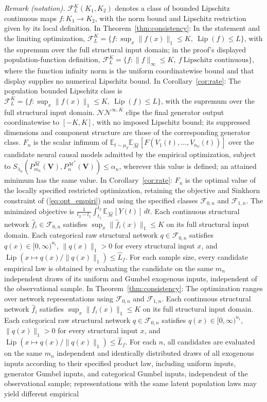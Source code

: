 \documentclass[12pt]{article}
\theoremstyle{plain}
\theoremstyle{definition}
\theoremstyle{remark}
\begin{document}
\noindent\textit{Remark (notation).} $\mathcal{F}_L^K(K_1,K_2)$ denotes a class of bounded Lipschitz continuous maps $f:K_1\rightarrow K_2$, with the norm bound and Lipschitz restriction given by its local definition. In Theorem~\ref{thm:consistency}: In the statement and the limiting optimization, $\mathcal F_L^K=\{f:\sup_x\|f(x)\|_1\leqslant K,\ \operatorname{Lip}(f)\leqslant L\}$, with the supremum over the full structural input domain; in the proof's displayed population-function definition, $\mathcal F_L^K=\{f:\|f\|_\infty\leqslant K,\ f\ \text{Lipschitz continuous}\}$, where the function infinity norm is the uniform coordinatewise bound and that display supplies no numerical Lipschitz bound. In Corollary~\ref{cor:rate}: The population bounded Lipschitz class is $\mathcal F_L^K=\{f:\sup_x\|f(x)\|_1\leqslant K,\ \operatorname{Lip}(f)\leqslant L\}$, with the supremum over the full structural input domain. $\mathcal{NN}^{\infty,K}$ clips the final generator output coordinatewise to $[-K,K]$, with no imposed Lipschitz bound; its suppressed dimensions and component structure are those of the corresponding generator class. $F_n$ is the scalar infimum of $\mathbb{E}_{t\sim\mu_T}\mathbb{E}_{\hat{\mathcal{M}}}[F(V_1(t),\ldots,V_{n_V}(t))]$ over the candidate neural causal models admitted by the empirical optimization, subject to $S_{\lambda_n}(P_{m_n}^{\hat{\mathcal{M}}}(\boldsymbol{V}),P_n^{\mathcal{M}^*}(\boldsymbol{V}))\leqslant\alpha_n$, wherever this value is defined; an attained minimum has the same value. In Corollary~\ref{cor:rate}: $F_n$ is the optimal value of the locally specified restricted optimization, retaining the objective and Sinkhorn constraint of (\ref{eq:opt_empiri}) and using the specified classes $\mathcal F_{0,n}$ and $\mathcal F_{1,n}$. The minimized objective is $\frac{1}{t_2-t_1}\int_{t_1}^{t_2}\mathbb E_{\hat{\mathcal M}}[Y(t)]\,dt$. Each continuous structural network $\hat f_i\in\mathcal F_{0,n}$ satisfies $\sup_x\|\hat f_i(x)\|_1\leqslant K$ on its full structural input domain. Each categorical raw structural network $q\in\mathcal F_{0,n}$ satisfies $q(x)\in[0,\infty)^{n_i}$, $\|q(x)\|_1>0$ for every structural input $x$, and $\operatorname{Lip}(x\mapsto q(x)/\|q(x)\|_1)\leqslant\hat L_f$. For each sample size, every candidate empirical law is obtained by evaluating the candidate on the same $m_n$ independent draws of its uniform and Gumbel exogenous inputs, independent of the observational sample. In Theorem~\ref{thm:consistency}: The optimization ranges over network representations using $\mathcal F_{0,n}$ and $\mathcal F_{1,n}$. Each continuous structural network $\hat f_i$ satisfies $\sup_x\|\hat f_i(x)\|_1\leqslant K$ on its full structural input domain. Each categorical raw structural network $q\in\mathcal F_{0,n}$ satisfies $q(x)\in[0,\infty)^{n_i}$, $\|q(x)\|_1>0$ for every structural input $x$, and $\operatorname{Lip}(x\mapsto q(x)/\|q(x)\|_1)\leqslant\hat L_f$. For each $n$, all candidates are evaluated on the same $m_n$ independent and identically distributed draws of all exogenous inputs according to their specified product law, including uniform inputs, generator Gumbel inputs, and categorical Gumbel inputs, independent of the observational sample; representations with the same latent population laws may yield different empirical 
\end{document}
